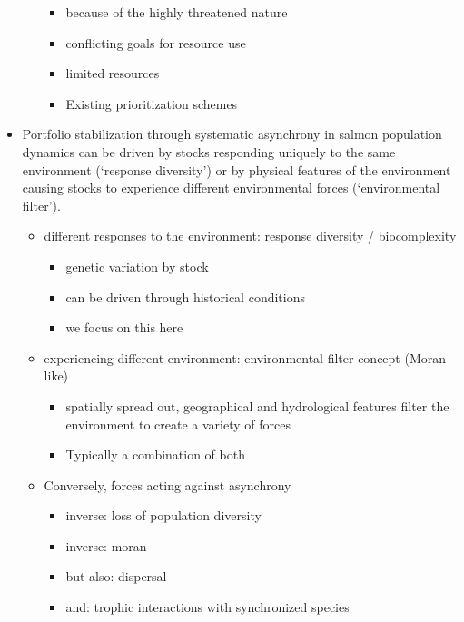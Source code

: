 \begin{itemize}
\begin{itemize}
    \begin{itemize}
    \itemsep1pt\parskip0pt
    \item
      because of the highly threatened nature
    \item
      conflicting goals for resource use
    \item
      limited resources
    \item
      Existing prioritization schemes
    \end{itemize}
  \end{itemize}
\item
  Portfolio stabilization through systematic asynchrony in salmon
  population dynamics can be driven by stocks responding uniquely to the
  same environment (`response diversity') or by physical features of the
  environment causing stocks to experience different environmental
  forces (`environmental filter').

  \begin{itemize}
  \itemsep1pt\parskip0pt
  \item
    different responses to the environment: response diversity /
    biocomplexity

    \begin{itemize}
    \itemsep1pt\parskip0pt
    \item
      genetic variation by stock
    \item
      can be driven through historical conditions
    \item
      we focus on this here
    \end{itemize}
  \item
    experiencing different environment: environmental filter concept
    (Moran like)

    \begin{itemize}
    \itemsep1pt\parskip0pt
    \item
      spatially spread out, geographical and hydrological features
      filter the environment to create a variety of forces
    \item
      Typically a combination of both
    \end{itemize}
  \item
    Conversely, forces acting against asynchrony

    \begin{itemize}
    \itemsep1pt\parskip0pt
    \item
      inverse: loss of population diversity
    \item
      inverse: moran
    \item
      but also: dispersal
    \item
      and: trophic interactions with synchronized species
    \end{itemize}
  \end{itemize}
\end{itemize}

